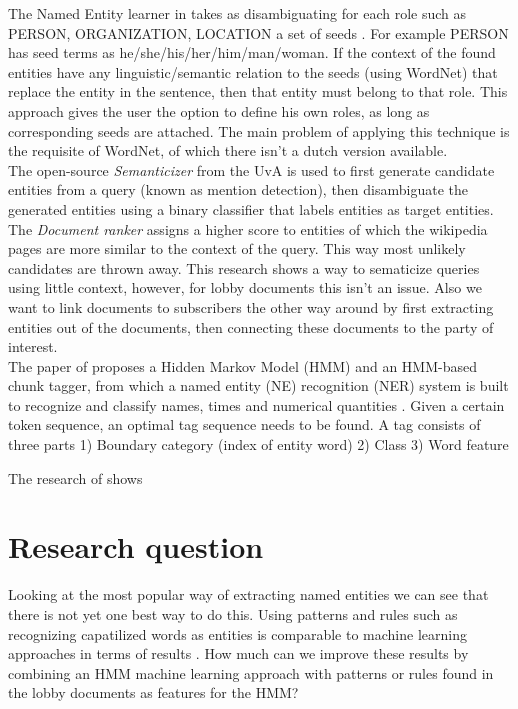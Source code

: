 \documentclass{article}
\begin{document}
The Named Entity learner in \cite{niu2003bootstrapping} takes as disambiguating for each role such as PERSON, ORGANIZATION, LOCATION a set of seeds . For example PERSON has seed terms as he/she/his/her/him/man/woman. If the context of the found entities have any linguistic/semantic relation to the seeds (using WordNet) that replace the entity in the sentence, then that entity must belong to that role. This approach gives the user the option to define his own roles, as long as corresponding seeds are attached. The main problem of applying this technique is the requisite of WordNet, of which there isn't a dutch version available.\\


The open-source \textit{Semanticizer} from the UvA \cite{graus2014semanticizing} is used to first generate candidate entities from a query (known as mention detection), then disambiguate the generated entities using a binary classifier that labels entities as target entities. The \textit{Document ranker} assigns a higher score to entities of which the wikipedia pages are more similar to the context of the query. This way most unlikely candidates are thrown away. This research shows a way to sematicize queries using little context, however, for lobby documents this isn't an issue. Also we want to link documents to subscribers the other way around by first extracting entities out of the documents, then connecting these documents to the party of interest.\\

The paper of \cite{zhou2002named} proposes a Hidden Markov Model (HMM) and an HMM-based chunk tagger, from which a named entity (NE)
recognition (NER) system is built to recognize and classify names, times and numerical quantities . Given a certain token sequence, an optimal tag sequence needs to be found. A tag consists of three parts 1) Boundary category (index of entity word) 2) Class 3) Word feature

The research of \cite{thede1999second} shows


\section{Research question}
Looking at the most popular way of extracting named entities we can see that there is not yet one best way to do this. Using patterns and rules such as recognizing capatilized words as entities is comparable to machine learning approaches in terms of results \cite{niu2003bootstrapping}. How much can we improve these results by combining an HMM machine learning approach \cite{zhou2002named} with patterns or rules found in the lobby documents as features for the HMM?
\end{document}
